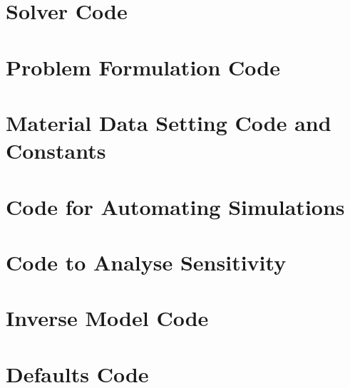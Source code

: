 \documentclass[MTech]{iitmdiss}
\begin{document}
\section{Solver Code}

\pagebreak
\section{Problem Formulation Code}

\pagebreak
\section{Material Data Setting Code and Constants}


\pagebreak
\section{Code for Automating Simulations}

\pagebreak
\section{Code to Analyse Sensitivity}

\pagebreak
\section{Inverse Model Code}

\pagebreak
\section{Defaults Code}

\pagebreak
\end{document}
